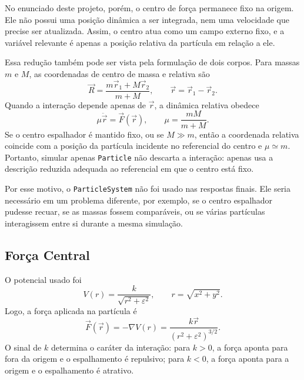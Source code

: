 No enunciado deste projeto, por\'em, o centro de for\c{c}a permanece fixo na origem. Ele n\~ao possui uma posi\c{c}\~ao din\^amica a ser integrada, nem uma velocidade que precise ser atualizada. Assim, o centro atua como um campo externo fixo, e a vari\'avel relevante \'e apenas a posi\c{c}\~ao relativa da part\'icula em rela\c{c}\~ao a ele.

Essa redu\c{c}\~ao tamb\'em pode ser vista pela formula\c{c}\~ao de dois corpos. Para massas $m$ e $M$, as coordenadas de centro de massa e relativa s\~ao
\begin{equation}
    \vec R = \frac{m\vec r_1 + M\vec r_2}{m+M},
    \qquad
    \vec r = \vec r_1-\vec r_2.
\end{equation}
Quando a intera\c{c}\~ao depende apenas de $\vec r$, a din\^amica relativa obedece
\begin{equation}
    \mu \ddot{\vec r} = \vec F(\vec r),
    \qquad
    \mu = \frac{mM}{m+M}.
\end{equation}
Se o centro espalhador \'e mantido fixo, ou se $M\gg m$, ent\~ao a coordenada relativa coincide com a posi\c{c}\~ao da part\'icula incidente no referencial do centro e $\mu\simeq m$. Portanto, simular apenas \texttt{Particle} n\~ao descarta a intera\c{c}\~ao: apenas usa a descri\c{c}\~ao reduzida adequada ao referencial em que o centro est\'a fixo.

Por esse motivo, o \texttt{ParticleSystem} n\~ao foi usado nas respostas finais. Ele seria necess\'ario em um problema diferente, por exemplo, se o centro espalhador pudesse recuar, se as massas fossem compar\'aveis, ou se v\'arias part\'iculas interagissem entre si durante a mesma simula\c{c}\~ao.

\subsection{For\c{c}a Central}

O potencial usado foi
\begin{equation}
    V(r)=\frac{k}{\sqrt{r^2+\varepsilon^2}},
    \qquad
    r=\sqrt{x^2+y^2}.
\end{equation}
Logo, a for\c{c}a aplicada na part\'icula \'e
\begin{equation}
    \vec F(\vec r)=-\nabla V(r)
    =
    \frac{k\vec r}{(r^2+\varepsilon^2)^{3/2}}.
\end{equation}
O sinal de $k$ determina o car\'ater da intera\c{c}\~ao: para $k>0$, a for\c{c}a aponta para fora da origem e o espalhamento \'e repulsivo; para $k<0$, a for\c{c}a aponta para a origem e o espalhamento \'e atrativo.


